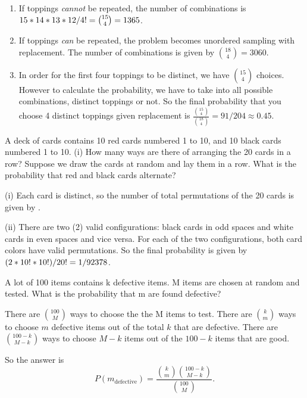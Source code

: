 \documentclass{article}
\begin{document}
    \begin{solution}
        \begin{enumerate}[label=(\alph*)]
            \item If toppings \emph{cannot} be repeated, the number of combinations is $15*14*13*12/4! = \binom{15}{4} = 1365$.
            \item If toppings \emph{can} be repeated, the problem becomes unordered sampling with replacement. The number of combinations is given by $\binom{18}{4} = 3060$.
            \item In order for the first four toppings to be distinct, we have $\binom{15}{4}$ choices. However to calculate the probability, we have to take into all possible combinations, distinct toppings or not. So the final probability that you choose 4 distinct toppings given replacement is $\frac{\binom{15}{4}}{\binom{18}{4}} = 91/204 \approx 0.45.$
        \end{enumerate}
    \end{solution}

    \nextproblem

    \begin{problem}
        A deck of cards contains 10 red cards numbered 1 to 10, and 10 black cards numbered 1 to 10. (i) How many ways are there of arranging the 20 cards in a row? Suppose we draw the cards at random and lay them in a row. What is the probability that red and black cards alternate?
    \end{problem}

    \begin{solution}
        (i) Each card is distinct, so the number of total permutations of the 20 cards is given by .

        (ii) There are two (2) valid configurations: black cards in odd spaces and white cards in even spaces and vice versa. For each of the two configurations, both card colors have  valid permutations. So the final probability is given by $(2*10!*10!)/20! = 1 / 92378$.
    \end{solution}

    \nextproblem

    \begin{problem}
        A lot of 100 items contains k defective items. M items are chosen at random and tested. What is the probability that m are found defective?
    \end{problem}

    \begin{solution}
        There are $\binom{100}{M}$ ways to choose the the M items to test. There are $\binom{k}{m}$ ways to choose $m$ defective items out of the total $k$ that are defective. There are $\binom{100 - k}{M - k}$ ways to choose $M - k$ items out of the $100 - k$ items that are good. 

        So the answer is 
        \begin{equation}
            P(m_{\text{defective}}) = \frac{\binom{k}{m} \binom{100 - k}{M - k}} {\binom{100}{M}}.
        \end{equation} 
    \end{solution}
    
\end{document}
